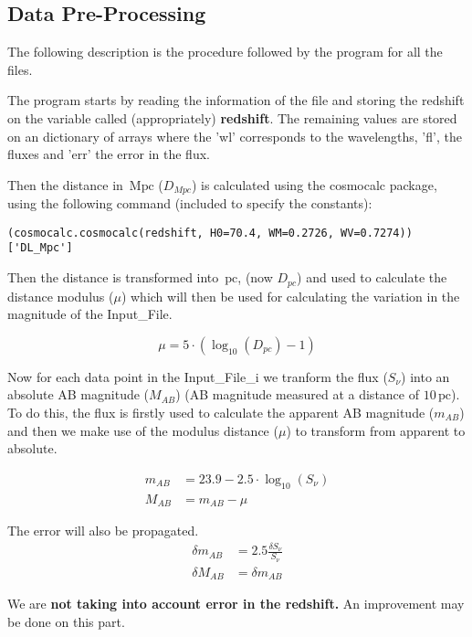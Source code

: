 \documentclass[11pt]{article}
\newcommand{\unit}[1]{\ensuremath{\, \mathrm{#1}}}
\begin{document}
\subsection{Data Pre-Processing}

The following description is the procedure followed by the program for all the files.

The program starts by reading the information of the file and storing the redshift on the variable called (appropriately) {\bf redshift}. The remaining values are stored on an dictionary of arrays where the 'wl' corresponds to the wavelengths, 'fl', the fluxes and 'err' the error in the flux.

Then the distance in $\unit{Mpc}$ ($D_{Mpc}$) is calculated using the cosmocalc package, using the following command (included to specify the constants):
\begin{verbatim}
(cosmocalc.cosmocalc(redshift, H0=70.4, WM=0.2726, WV=0.7274))['DL_Mpc']
\end{verbatim}

Then the distance is transformed into $\unit{pc}$, (now $D_{pc}$) and used to calculate the distance modulus ($\mu$) which will then be used for calculating the variation in the magnitude of the Input\_File.

\begin{equation}
\mu = 5 \cdot ( \log_{10}( D_{pc}) - 1)
\end{equation}

Now for each data point in the Input\_File\_i we tranform the flux ($S_\nu$) into an absolute AB magnitude ($M_{AB}$) (AB magnitude measured at a distance of $10 \unit{pc}$). To do this, the flux is firstly used to calculate the apparent AB magnitude ($m_{AB}$) and then we make use of the modulus distance ($\mu$) to transform from apparent to absolute.

\begin{align}
m_{AB} &= 23.9 - 2.5 \cdot \log_{10}(S_\nu)\\
M_{AB} &= m_{AB} - \mu
\end{align}

The error will also be propagated.
\begin{align*}
\delta m_{AB} &= 2.5 \frac{\delta S_\nu}{S_\nu}\\
\delta M_{AB} &= \delta m_{AB}
\end{align*}

We are {\bf not taking into account error in the redshift.} An improvement may be done on this part.
\end{document}
